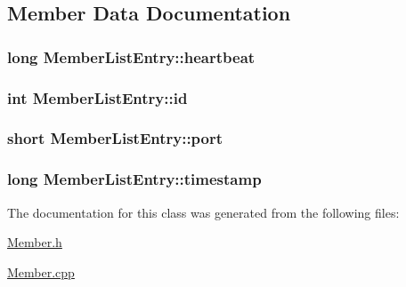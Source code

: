 \subsection{Member Data Documentation}
\hypertarget{class_member_list_entry_ae01ac985a9a529b0046bc463e97b9a52}{}
\subsubsection[{heartbeat}]{\setlength{\rightskip}{0pt plus 5cm}long Member\+List\+Entry\+::heartbeat}\label{class_member_list_entry_ae01ac985a9a529b0046bc463e97b9a52}
\hypertarget{class_member_list_entry_a569594f798c011bec978d7de9af9e87c}{}
\subsubsection[{id}]{\setlength{\rightskip}{0pt plus 5cm}int Member\+List\+Entry\+::id}\label{class_member_list_entry_a569594f798c011bec978d7de9af9e87c}
\hypertarget{class_member_list_entry_ae85ba26966dc188c7fec4c298fb47a81}{}
\subsubsection[{port}]{\setlength{\rightskip}{0pt plus 5cm}short Member\+List\+Entry\+::port}\label{class_member_list_entry_ae85ba26966dc188c7fec4c298fb47a81}
\hypertarget{class_member_list_entry_ae15f1e7b93b9f19be264930c783615cc}{}
\subsubsection[{timestamp}]{\setlength{\rightskip}{0pt plus 5cm}long Member\+List\+Entry\+::timestamp}\label{class_member_list_entry_ae15f1e7b93b9f19be264930c783615cc}


The documentation for this class was generated from the following files\+:\begin{DoxyCompactItemize}
\item 
\hyperlink{_member_8h}{Member.\+h}\item 
\hyperlink{_member_8cpp}{Member.\+cpp}\end{DoxyCompactItemize}
